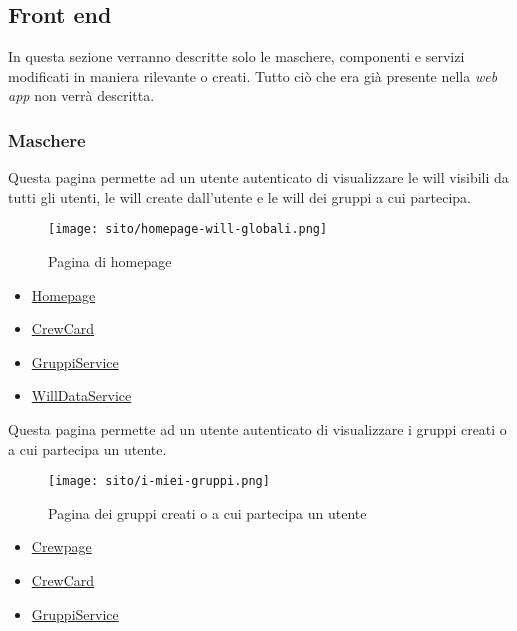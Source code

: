 \subsection{Front end}
In questa sezione verranno descritte solo le maschere, componenti e servizi modificati in maniera rilevante o creati. Tutto ciò che era già presente nella \textit{web app} non verrà descritta.
\subsubsection{Maschere}
Questa pagina permette ad un utente autenticato di visualizzare le \gls{will} visibili da tutti gli utenti, le \gls{will} create dall'utente e le \gls{will} dei gruppi a cui partecipa.
\begin{figure}[H] 
    \centering 
    \texttt{[image: sito/homepage-will-globali.png]} 
    \caption{Pagina di homepage}
\end{figure}
\begin{itemize}
    \item \hyperref[par:Homepage]{Homepage}
    \item \hyperref[par:CrewCard]{CrewCard}
\end{itemize}
\begin{itemize}
    \item \hyperref[par:GruppiService]{GruppiService}
    \item \hyperref[par:WillDataService]{WillDataService}
\end{itemize}

Questa pagina permette ad un utente autenticato di visualizzare i gruppi creati o a cui partecipa un utente. 
\begin{figure}[H] 
    \centering 
    \texttt{[image: sito/i-miei-gruppi.png]} 
    \caption{Pagina dei gruppi creati o a cui partecipa un utente}
\end{figure}
\begin{itemize}
    \item \hyperref[par:Crewpage]{Crewpage}
    \item \hyperref[par:CrewCard]{CrewCard}
\end{itemize}
\begin{itemize}
    \item \hyperref[par:GruppiService]{GruppiService}
\end{itemize}


